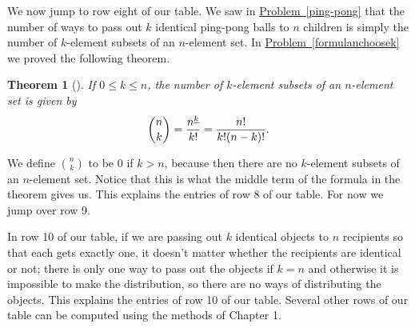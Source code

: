 \documentclass[10pt,]{book}
\theoremstyle{plain}
\newtheorem{theorem}{Theorem}[section]
\theoremstyle{definition}
\numberwithin{equation}{chapter}
\begin{document}
\par
We now jump to row eight of our table. We saw in \hyperref[ping-pong]{Problem~\ref{ping-pong}} that the number of ways to pass out \(k\) identical ping-pong balls to \(n\) children is simply the number of \(k\)-element subsets of an \(n\)-element set. In \hyperref[formulanchoosek]{Problem~\ref{formulanchoosek}} we proved the following theorem.%
\begin{theorem}[{}]\label{theorem-5}
If \(0\le k \le n\), the number of \(k\)-element subsets of an \(n\)-element set is given by%
\begin{equation*}
\binom{n}{k} = {n^{\underline{k}}\over k!}
= \frac{n!}{k!(n-k)!}.
\end{equation*}
%
\end{theorem}
We define \(\binom{n}{k}\) to be 0 if \(k>n\), because then there are no \(k\)-element subsets of an \(n\)-element set. Notice that this is what the middle term of the formula in the theorem gives us. This explains the entries of row 8 of our table. For now we jump over row 9.%
\par
In row 10 of our table, if we are passing out \(k\) identical objects to \(n\) recipients so that each gets exactly one, it doesn't matter whether the recipients are identical or not; there is only one way to pass out the objects if \(k=n\) and otherwise it is impossible to make the distribution, so there are no ways of distributing the objects. This explains the entries of row 10 of our table. Several other rows of our table can be computed using the methods of Chapter 1.%
\typeout{************************************************}
\typeout{************************************************}
\end{document}
